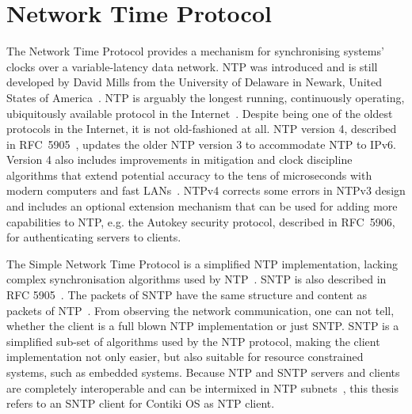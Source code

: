 
\chapter{Network Time Protocol}
The Network Time Protocol provides a mechanism for synchronising systems' clocks over a variable-latency data network.
NTP was introduced and is still developed by
David Mills from the University of Delaware in Newark, United States of America~\cite{ntp-history}.
NTP is arguably the longest running, continuously operating,
ubiquitously available protocol in the Internet~\cite{ntp-overview}.
Despite being one of the oldest protocols in the Internet, it is not old-fashioned at all.
NTP version 4, described in RFC~5905~\cite{rfc5905}, updates the older NTP version 3 to accommodate NTP to IPv6.
Version 4 also includes improvements in
mitigation and clock discipline algorithms that extend
potential accuracy to the tens of microseconds with modern
computers and fast LANs~\cite{rfc5905}.
NTPv4 corrects some
errors in NTPv3 design and includes an optional extension mechanism
that can be used for adding more capabilities to NTP, e.g. the
Autokey security protocol, described in RFC~5906,
for authenticating servers to clients.

The Simple Network Time Protocol is a simplified NTP implementation, lacking complex
synchronisation algorithms used by NTP~\cite{rfc5905}.
SNTP is also described in RFC 5905~\cite{rfc5905}.
The packets of SNTP have the same structure and content as packets of NTP~\cite{rfc5905}.
From observing the network communication, one can not tell, whether the client
is a full blown NTP implementation or just SNTP.
SNTP is a simplified sub-set of algorithms used by the NTP protocol,
making the client implementation not only easier, but also suitable for
resource constrained systems, such as embedded systems.
Because NTP and SNTP servers and clients are
completely interoperable and can be intermixed in NTP subnets~\cite{rfc5905},
this thesis refers to an SNTP client for Contiki OS as NTP client.









